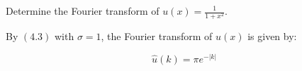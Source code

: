Determine the Fourier transform of $u(x) = \frac{1}{1+x^2}$.

\begin{solution}
  By $(4.3)$ with $\sigma = 1$, the Fourier transform of $u(x)$ is given by:

  $$
  \hat{u}(k) = \pi e^{-\left\vert k \right\vert}
  $$
  \ \\
\end{solution}